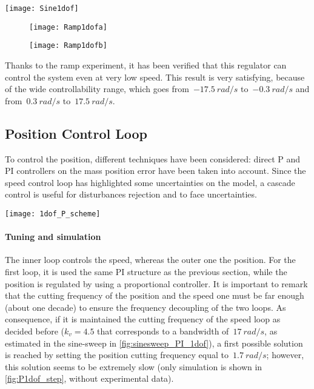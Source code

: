 \begin{figure*}[h]
	\centering
	\texttt{[image: Sine1dof]}
	\caption{Sineweep experiment from $0.1\ Hz$ to $10\ Hz$ in $100\ s$}
	\label{fig:sinesweep_PI_1dof}
\end{figure*}

\begin{figure*}[h]
	\centering
	\begin{subfigure}{0.4\columnwidth}
		\texttt{[image: Ramp1dofa]}
	\end{subfigure}
	\begin{subfigure}{0.4\columnwidth}
		\texttt{[image: Ramp1dofb]}
	\end{subfigure}
	\caption{Ramp experiment from $17\ rad/s$ to $0\ rad/s$ in $100\ s$}
	\label{fig:Ramp1dof}
\end{figure*}

Thanks to the ramp experiment, it has been verified that this regulator can control the system even at very low speed. This result is very satisfying, because of the wide controllability range, which goes from~$-17.5\ rad/s$ to~$-0.3\ rad/s$ and from~$0.3\ rad/s$ to~$17.5\ rad/s$.

\newpage
\subsection{Position Control Loop}
To control the position, different techniques have been considered: direct P and PI controllers on the mass position error have been taken into account. Since the speed control loop has highlighted some uncertainties on the model, a cascade control is useful for disturbances rejection and to face uncertainties.
\begin{figure*}[h]
	\centering
	\texttt{[image: 1dof\_P\_scheme]}
	\caption{Closed-loop block scheme}
\end{figure*}

\paragraph{Tuning and simulation}
The inner loop controls the speed, whereas the outer one the position. For the first loop, it is used the same PI structure as the previous section, while the position is regulated by using a proportional controller. It is important to remark that the cutting frequency of the position and the speed one must be far enough (about one decade) to ensure the frequency decoupling of the two loops. As consequence, if it is maintained the cutting frequency of the speed loop as decided before ($k_v=4.5$ that corresponds to a bandwidth of~$17\ rad/s$, as estimated in the sine-sweep in \cref{fig:sinesweep_PI_1dof}), a first possible solution is reached by setting the position cutting frequency equal to~$1.7\ rad/s$; however, this solution seems to be extremely slow (only simulation is shown in \cref{fig:P1dof_step}, without experimental data). \\

